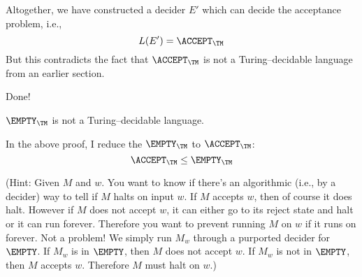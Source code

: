 Altogether, we have constructed a decider $E'$ which can 
decide the acceptance problem, i.e.,
\[
L(E') = \ACCEPT_\TM
\]
But this contradicts the fact that $\ACCEPT_\TM$ is not a 
Turing--decidable language from an earlier section.

Done!

\begin{thm}
$\EMPTY_\TM$ is not a Turing--decidable language.
\end{thm}

In the above proof, I reduce the $\EMPTY_\TM$ to $\ACCEPT_\TM$:
\[
\ACCEPT_\TM \leq \EMPTY_\TM
\]





(Hint: Given $M$ and $w$.
You want to know if there's an algorithmic (i.e., by a decider) way
to tell if $M$ halts on input $w$.
If $M$ accepts $w$, then of course it does halt.
However if $M$ does not accept $w$, it can either 
go to its reject state and halt or it can run forever.
Therefore you want to prevent running $M$ on $w$
if it runs on forever.
Not a problem!
We simply run $M_w$ through a purported decider for 
$\EMPTY$.
If $M_w$ is in $\EMPTY$, then $M$ does not accept $w$.
If $M_w$ is not in $\EMPTY$, then $M$ accepts $w$.
Therefore $M$ must halt on $w$.)


